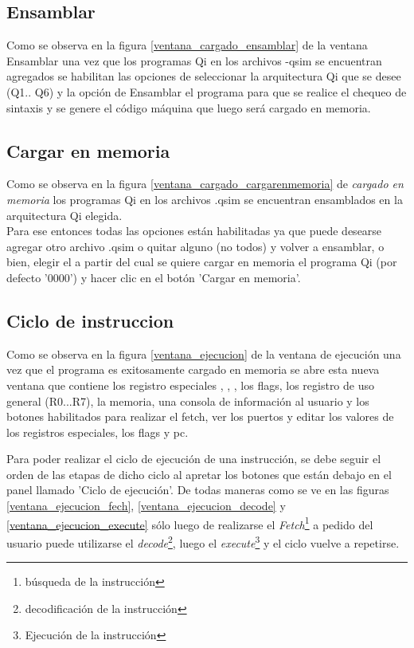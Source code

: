 \subsection{Ensamblar}
Como se observa en la figura \ref{ventana_cargado_ensamblar} de la ventana Ensamblar una vez que los programas Qi en los archivos -qsim se encuentran agregados se habilitan las opciones de seleccionar la arquitectura Qi que se desee (Q1.. Q6) y la opción de Ensamblar el programa para que se realice el chequeo de sintaxis y se genere el código máquina que luego será cargado en memoria.


\subsection{Cargar en memoria}
Como se observa en la figura \ref{ventana_cargado_cargarenmemoria} de \textit{cargado en memoria} los programas Qi en los archivos .qsim se encuentran ensamblados en la arquitectura Qi elegida.\\
Para ese entonces todas las opciones están habilitadas ya que puede desearse agregar otro archivo .qsim o quitar alguno (no todos) y volver a ensamblar, o bien, elegir el \PC a partir del cual se quiere cargar en memoria el programa Qi (por defecto '0000') y hacer clic en el botón 'Cargar en memoria'.

\subsection{Ciclo de instruccion}
Como se observa en la figura \ref{ventana_ejecucion} de la ventana de ejecución una vez que el programa es exitosamente cargado en memoria se abre esta nueva ventana que contiene los registro especiales \PC, \IR, \SP, los flags, los registro de uso general (R0...R7), la memoria, una consola de información al usuario y los botones habilitados para realizar el fetch, ver los puertos y editar los valores de los registros especiales, los flags y pc.


Para poder realizar el ciclo de ejecución de una instrucción, se debe seguir el orden de las etapas de dicho ciclo al apretar los botones que están debajo en el panel llamado 'Ciclo de ejecución'. De todas maneras como se ve en las figuras \ref{ventana_ejecucion_fech}, \ref{ventana_ejecucion_decode} y \ref{ventana_ejecucion_execute} sólo luego de realizarse el \textit{Fetch}\footnote{búsqueda de la instrucción} a pedido del usuario puede utilizarse el \textit{decode}\footnote{decodificación de la instrucción}, luego el \textit{execute}\footnote{Ejecución de la instrucción} y el ciclo vuelve a repetirse.\\

